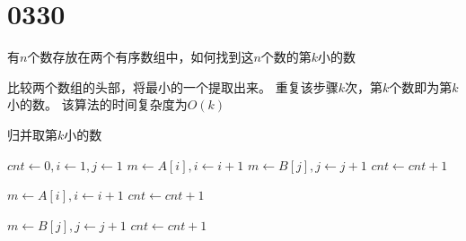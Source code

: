 
\section{0330}\label{sec:0330}
\begin{questions}

    \question 有$n$个数存放在两个有序数组中，如何找到这$n$个数的第$k$小的数

    \begin{solution}
        比较两个数组的头部，将最小的一个提取出来。
        重复该步骤$k$次，第$k$个数即为第$k$小的数。
        该算法的时间复杂度为$O(k)$

        \begin{algorithm}[H]
            \caption{归并取第$k$小的数}\label{0330:MeargeSmallestK}
            \begin{algorithmic}[1]
                 
                \State $cnt \gets 0, i \gets 1, j \gets 1$
                \State $m \gets A[i], i \gets i + 1$
                \Else
                \State $m \gets B[j], j \gets j + 1$
                \EndIf
                \State $cnt \gets cnt + 1$
                \EndWhile

                \State $m \gets A[i], i \gets i + 1$
                \State $cnt \gets cnt + 1$
                \EndWhile

                \State $m \gets B[j], j \gets j + 1$
                \State $cnt \gets cnt + 1$
                \EndWhile
            \end{algorithmic}
        \end{algorithm}
    \end{solution}


\end{questions}
